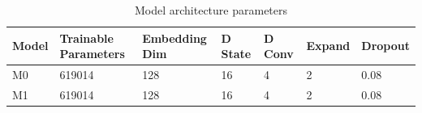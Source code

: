 \begin{table}[t]
\centering
\caption{Model architecture parameters}
\label{tab:model}
\begin{tabular}{lllllll}
\hline
Model & Trainable Parameters & Embedding Dim & D State & D Conv & Expand & Dropout \\
\hline
M0 & 619014 & 128 & 16 & 4 & 2 & 0.08 \\
M1 & 619014 & 128 & 16 & 4 & 2 & 0.08 \\
\hline
\end{tabular}
\end{table}
